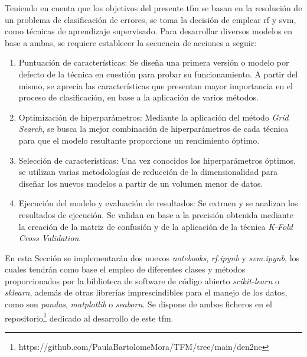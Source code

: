 Teniendo en cuenta que los objetivos del presente \gls{tfm} se basan en la resolución de un problema de clasificación de errores, se toma la decisión de emplear \gls{rf} y \gls{svm}, como técnicas de aprendizaje supervisado. Para desarrollar diversos modelos en base a ambas, se requiere establecer la  secuencia de acciones a seguir: 

\begin{enumerate}
    \item Puntuación de características: Se diseña una primera versión o modelo por defecto de la técnica en cuestión para probar su funcionamiento. A partir del mismo, se aprecia las características que presentan mayor importancia en el proceso de clasificación, en base a la aplicación de varios métodos. 
    \item Optimización de hiperparámetros: Mediante la aplicación del método \textit{Grid Search}, se busca la mejor combinación de hiperparámetros de cada técnica para que el modelo resultante proporcione un rendimiento óptimo. 
    \item Selección de características: Una vez conocidos los hiperparámetros óptimos, se utilizan varias metodologías de reducción de la dimensionalidad para diseñar los nuevos modelos a partir de un volumen menor de datos.
    \item Ejecución del modelo y evaluación de resultados: Se extraen y se analizan los resultados de ejecución. Se validan en base a la precisión obtenida mediante la creación de la matriz de confusión y de la aplicación de la técnica \textit{K-Fold Cross Validation}.
\end{enumerate}

En esta Sección se implementarán dos nuevos \textit{notebooks}, \textit{rf.ipynb} y \textit{svm.ipynb}, los cuales tendrán como base el empleo de diferentes clases y métodos proporcionados por la biblioteca de software de código abierto \textit{scikit-learn} o \textit{sklearn}, además de otras librerías imprescindibles para el manejo de los datos, como son \textit{pandas}, \textit{matplotlib} o \textit{seaborn}. Se dispone de ambos ficheros en el repositorio\footnote{https://github.com/PaulaBartolomeMora/TFM/tree/main/den2ne} dedicado al desarrollo de este \gls{tfm}.



\vspace{3mm}



